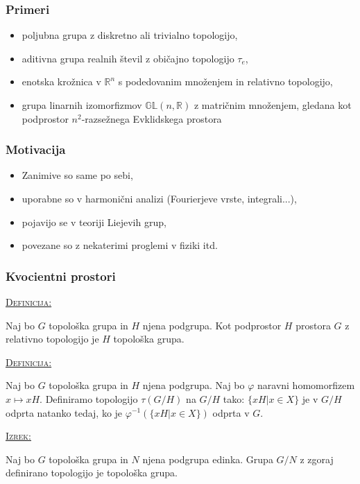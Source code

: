 \documentclass[a4paper, 12pt]{beamer}
\newenvironment{matematika}[1]{
\textcolor{bostonuniversityred}{\underline{\textsc{#1:}}}
}{
}
\begin{document}
\begin{frame}
\frametitle{Primeri}
\begin{itemize}[label=]
\item<1-> poljubna grupa z diskretno ali trivialno topologijo,
\item<2-> aditivna grupa realnih števil z običajno topologijo $\tau_e$,
\item<3-> enotska krožnica v $\mathbb{R}^n$ s podedovanim množenjem in relativno topologijo,
\item<4-> grupa linarnih izomorfizmov $\mathbb{GL}(n,\mathbb{R})$ z matričnim množenjem, gledana kot podprostor $n^2$-razsežnega Evklidskega prostora
\end{itemize}
\end{frame}

\begin{frame}
\frametitle{Motivacija}
\begin{itemize}[label=]
\item<1-> Zanimive so same po sebi,
\item<2-> uporabne so v harmonični analizi (Fourierjeve vrste, integrali...),
\item<3-> pojavijo se v teoriji Liejevih grup,
\item<4-> povezane so z nekaterimi proglemi v fiziki itd.
\end{itemize}
\end{frame}

\begin{frame}
\frametitle{Kvocientni prostori}
\begin{matematika}{Definicija}
Naj bo $G$ topološka grupa in $H$ njena podgrupa. Kot podprostor $H$ prostora $G$ z relativno topologijo je $H$ topološka grupa.
\end{matematika}

\pause

\begin{matematika}{Definicija}
Naj bo $G$ topološka grupa in $H$ njena podgrupa. Naj bo $\varphi$ naravni homomorfizem $x \mapsto xH$. Definiramo topologijo $\tau (G/H)$ na $G/H$ tako: $\{ xH | x \in X \}$ je v $G/H$ odprta natanko tedaj, ko je $\varphi^{-1}(\{ xH | x \in X \})$ odprta v $G$.
\end{matematika} \newline

\pause

\begin{matematika}{Izrek}
Naj bo $G$ topološka grupa in $N$ njena podgrupa edinka. Grupa $G/N$ z zgoraj definirano topologijo je topološka grupa.
\end{matematika}
\end{frame}
\end{document}
